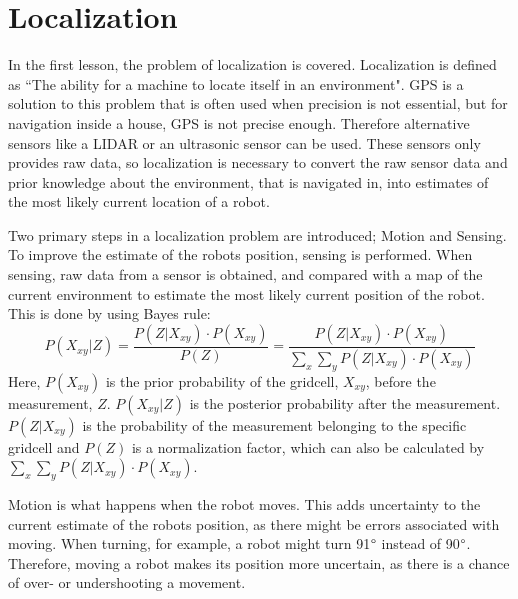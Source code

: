 \documentclass[Main]{subfiles}
\begin{document}
\section{Localization} %
	\label{sec:localization}
In the first lesson, the problem of localization is covered. 
Localization is defined as “The ability for a machine to locate itself in an environment". 
GPS is a solution to this problem that is often used when precision is not essential, but for navigation inside a house, GPS is not precise enough. 
Therefore alternative sensors like a LIDAR or an ultrasonic sensor can be used. 
These sensors only provides raw data, so localization is necessary to convert the raw sensor data and prior knowledge about the environment, that is navigated in, into estimates of the most likely current location of a robot.

Two primary steps in a localization problem are introduced; Motion and Sensing.
To improve the estimate of the robots position, sensing is performed. 
When sensing, raw data from a sensor is obtained, and compared with a map of the current environment to estimate the most likely current position of the robot. 
This is done by using Bayes rule:
\begin{equation}
\label{eq:bayes_rule}
P(X_{xy}|Z) = \frac{P(Z|X_{xy})\cdot P(X_{xy})}{P(Z)} = \frac{P(Z|X_{xy})\cdot P(X_{xy})}{\sum_{x} \sum_{y} P(Z|X_{xy})\cdot P(X_{xy})}
\end{equation}
Here, $P(X_{xy})$ is the prior probability of the gridcell, $X_{xy}$, before the measurement, $Z$.
$P(X_{xy}|Z)$ is the posterior probability after the measurement. 
$P(Z|X_{xy})$ is the probability of the measurement belonging to the specific gridcell and $P(Z)$ is a normalization factor, which can also be calculated by $\sum_{x} \sum_{y} P(Z|X_{xy})\cdot P(X_{xy})$.

Motion is what happens when the robot moves. 
This adds uncertainty to the current estimate of the robots position, as there might be errors associated with moving. 
When turning, for example, a robot might turn 91$\degree$ instead of 90$\degree$. 
Therefore, moving a robot makes its position more uncertain, as there is a chance of over- or undershooting a movement.
\end{document}
